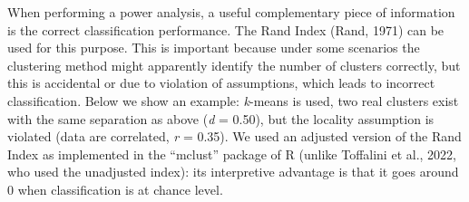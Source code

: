 \documentclass[
  man,floatsintext]{apa7}
\begin{document}
When performing a power analysis, a useful complementary piece of information is the correct classification performance. The Rand Index (Rand, 1971) can be used for this purpose. This is important because under some scenarios the clustering method might apparently identify the number of clusters correctly, but this is accidental or due to violation of assumptions, which leads to incorrect classification. Below we show an example: \emph{k}-means is used, two real clusters exist with the same separation as above (\emph{d} = 0.50), but the locality assumption is violated (data are correlated, \emph{r} = 0.35). We used an adjusted version of the Rand Index as implemented in the ``mclust'' package of R (unlike Toffalini et al., 2022, who used the unadjusted index): its interpretive advantage is that it goes around 0 when classification is at chance level.
\end{document}

